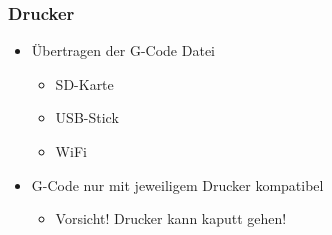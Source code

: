 {
\begin{frame}
  \frametitle{Drucker}
  \begin{itemize}
    \item Übertragen der G-Code Datei \pause
    \begin{itemize}
      \item SD-Karte \pause
      \item USB-Stick \pause
      \item WiFi \pause
    \end{itemize}
    \item G-Code nur mit jeweiligem Drucker kompatibel \pause
    \begin{itemize}
      \item Vorsicht! Drucker kann kaputt gehen!
    \end{itemize}
  \end{itemize}
\end{frame}
}
